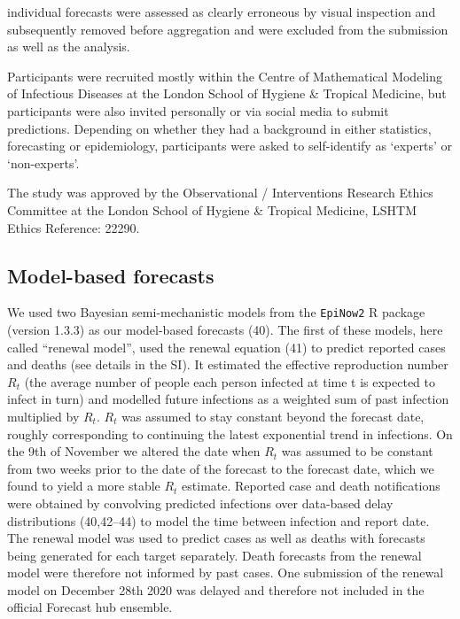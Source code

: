 \documentclass[
]{article}
\providecommand{\DIFaddend}{} %
\DeclareRobustCommand{\DIFaddend}{\DIFOaddend \let\includegraphics\DIFOincludegraphics} %
\begin{document}
\DIFaddend individual forecasts were assessed as clearly erroneous by visual inspection and subsequently removed before aggregation and were excluded from the submission as well as the analysis.

Participants were recruited mostly within the Centre of Mathematical Modeling of Infectious Diseases at the London School of Hygiene \& Tropical Medicine, but participants were also invited personally or via social media to submit predictions. Depending on whether they had a background in either statistics, forecasting or epidemiology, participants were asked to self-identify as `experts' or `non-experts'.

The study was approved by the Observational / Interventions Research Ethics Committee at the London School of Hygiene \& Tropical Medicine, LSHTM Ethics Reference: 22290.

\hypertarget{model-based-forecasts}{%
\subsection{Model-based forecasts}\label{model-based-forecasts}}

We used two Bayesian semi-mechanistic models from the \texttt{EpiNow2} R package (version 1.3.3) as our model-based forecasts (40). The first of these models, here called ``renewal model'', used the renewal equation (41) to predict reported cases and deaths (see details in the SI). It estimated the effective reproduction number \(R_t\) (the average number of people each person infected at time t is expected to infect in turn) and modelled future infections as a weighted sum of past infection multiplied by \(R_t\). \(R_t\) was assumed to stay constant beyond the forecast date, roughly corresponding to continuing the latest exponential trend in infections. On the 9th of November we altered the date when \(R_t\) was assumed to be constant from two weeks prior to the date of the forecast to the forecast date, which we found to yield a more stable \(R_t\) estimate. Reported case and death notifications were obtained by convolving predicted infections over data-based delay distributions (40,42--44) to model the time between infection and report date. The renewal model was used to predict cases as well as deaths with forecasts being generated for each target separately. Death forecasts from the renewal model were therefore not informed by past cases. One submission of the renewal model on December 28th 2020 was delayed and therefore not included in the official Forecast hub ensemble.
\end{document}
